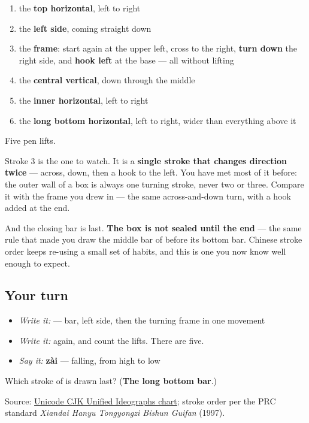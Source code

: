 \begin{enumerate}
\raggedright
  \item the \textbf{top horizontal}, left to right
  \item the \textbf{left side}, coming straight down
  \item the \textbf{frame}: start again at the upper left, cross to the right, \textbf{turn down} the right side, and \textbf{hook left} at the base — all without lifting
  \item the \textbf{central vertical}, down through the middle
  \item the \textbf{inner horizontal}, left to right
  \item the \textbf{long bottom horizontal}, left to right, wider than everything above it
\end{enumerate}

Five pen lifts.

Stroke 3 is the one to watch. It is a \textbf{single stroke that changes direction twice} — across, down, then a hook to the left. You have met most of it before: the outer wall of a box is always one turning stroke, never two or three. Compare it with the frame you drew in  — the same across-and-down turn, with a hook added at the end.

And the closing bar is last. \textbf{The box is not sealed until the end} — the same rule that made you draw the middle bar of  before its bottom bar. Chinese stroke order keeps re-using a small set of habits, and this is one you now know well enough to expect.

\subsection*{Your turn}
\begin{itemize}
\raggedright
  \item \emph{Write it:}  — bar, left side, then the turning frame in one movement
  \item \emph{Write it:}  again, and count the lifts. There are five.
  \item \emph{Say it:} \textbf{zài} — falling, from high to low
\end{itemize}

\begin{tcolorbox}[breakable,colback=teal!4,colframe=teal!35!black,title={Before you move on}]
Which stroke of  is drawn last? (\textbf{The long bottom bar}.)

Source: \href{https://www.unicode.org/charts/PDF/U4E00.pdf}{Unicode CJK Unified Ideographs chart}; stroke order per the PRC standard \emph{Xiandai Hanyu Tongyongzi Bishun Guifan} (1997).
\end{tcolorbox}
